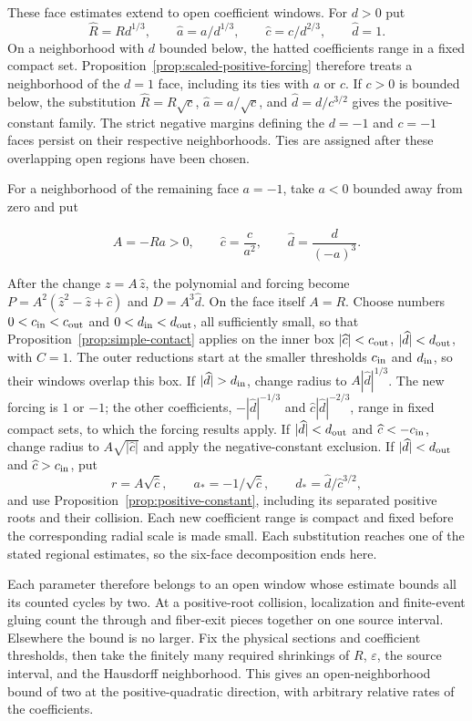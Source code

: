 These face estimates extend to open coefficient windows. For $d>0$ put
\[
 \widehat R=R d^{1/3},\qquad
 \widehat a=a/d^{1/3},\qquad
 \widehat c=c/d^{2/3},\qquad \widehat d=1 .
\]
On a neighborhood with $d$ bounded below, the hatted coefficients range
in a fixed compact set. Proposition~\ref{prop:scaled-positive-forcing}
therefore treats a neighborhood of the $d=1$ face, including its ties
with $a$ or $c$. If $c>0$ is bounded below, the substitution
\(\widehat R=R\sqrt c\), \(\widehat a=a/\sqrt c\), and
\(\widehat d=d/c^{3/2}\) gives the positive-constant family.  The strict
negative margins defining the $d=-1$ and $c=-1$ faces persist on their
respective neighborhoods. Ties are assigned after these overlapping
open regions have been chosen.

For a neighborhood of the remaining face $a=-1$, take $a<0$
bounded away from zero and put

\[
 A=-Ra>0,\qquad \widehat c=\frac{c}{a^2},\qquad
 \widehat d=\frac{d}{(-a)^3}.
\]

After the change $z=A\,\widehat z$, the polynomial and forcing become
$P=A^2(\widehat z^2-\widehat z+\widehat c)$ and
$D=A^3\widehat d$. On the face itself $A=R$.
Choose numbers
\(0<c_{\rm in}<c_{\rm out}\) and
\(0<d_{\rm in}<d_{\rm out}\), all sufficiently small, so that
Proposition~\ref{prop:simple-contact} applies on the inner box
$|\widehat c|<c_{\rm out}$, $|\widehat d|<d_{\rm out}$, with $C=1$.
The outer reductions start at the smaller thresholds $c_{\rm in}$
and $d_{\rm in}$, so their windows overlap this box.
If $|\widehat d|>d_{\rm in}$, change radius
to $A|\widehat d|^{1/3}$. The new forcing is $1$ or $-1$; the other
coefficients, $-|\widehat d|^{-1/3}$ and
$\widehat c|\widehat d|^{-2/3}$, range in fixed
compact sets, to which the forcing results apply. If
$|\widehat d|<d_{\rm out}$
and $\widehat c<-c_{\rm in}$, change radius to
$A\sqrt{|\widehat c|}$ and apply
the negative-constant exclusion. If $|\widehat d|<d_{\rm out}$ and
 $\widehat c>c_{\rm in}$,
put
\[
 r=A\sqrt{\widehat c},\qquad a_*=-1/\sqrt{\widehat c},\qquad
 d_*=\widehat d/\widehat c^{3/2},
\]
and use Proposition~\ref{prop:positive-constant}, including its
separated positive roots and their collision. Each new coefficient
range is compact and fixed before the corresponding radial scale is made
small. Each substitution reaches one of the stated regional estimates,
so the six-face decomposition ends here.

Each parameter therefore belongs to an open window whose estimate
bounds all its counted cycles by two. At a positive-root collision,
localization and finite-event gluing count the through and fiber-exit
pieces together on one source interval. Elsewhere the bound is no
larger. Fix the physical sections and coefficient thresholds, then
take the finitely many required shrinkings of $R$, $\varepsilon$,
the source interval, and the Hausdorff neighborhood. This gives an
open-neighborhood bound of two at the positive-quadratic direction,
with arbitrary relative rates of the coefficients.

